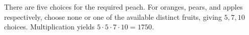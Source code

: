 There are five choices for the required peach. For oranges, pears, and apples respectively, choose none or one of the available distinct fruits, giving $5,7,10$ choices. Multiplication yields $5\cdot5\cdot7\cdot10=\boxed{1750}$.
